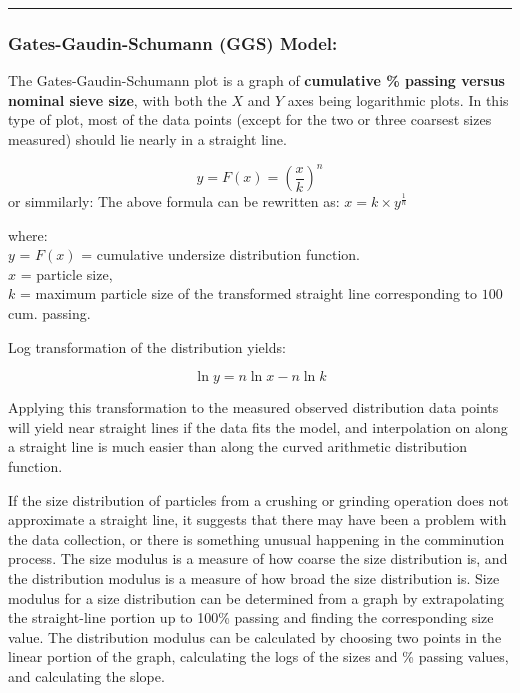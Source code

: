 \documentclass[
]{article}
\begin{document}
\begin{center}\rule{0.5\linewidth}{0.5pt}\end{center}

\hypertarget{gates-gaudin-schumann-ggs-model}{%
\subsubsection{Gates-Gaudin-Schumann (GGS)
Model:}\label{gates-gaudin-schumann-ggs-model}}

The Gates-Gaudin-Schumann plot is a graph of \textbf{cumulative \%
passing versus nominal sieve size}, with both the \(X\) and \(Y\) axes
being logarithmic plots. In this type of plot, most of the data points
(except for the two or three coarsest sizes measured) should lie nearly
in a straight line.

\[y = F(x) = \left(\frac{x}{k}\right) ^n\] or simmilarly: The above
formula can be rewritten as: \(x = k \times y ^ \frac{1}{n}\)

where:\\
\(y\) = \(F \left(x\right)\) = cumulative undersize distribution
function.\\
\(x\) = particle size,\\
\(k\) = maximum particle size of the transformed straight line
corresponding to \(100%
\) cum. passing.

Log transformation of the distribution yields:

\[\ln y = n \ln x - n \ln k\]

Applying this transformation to the measured observed distribution data
points will yield near straight lines if the data fits the model, and
interpolation on along a straight line is much easier than along the
curved arithmetic distribution function.

If the size distribution of particles from a crushing or grinding
operation does not approximate a straight line, it suggests that there
may have been a problem with the data collection, or there is something
unusual happening in the comminution process. The size modulus is a
measure of how coarse the size distribution is, and the distribution
modulus is a measure of how broad the size distribution is. Size modulus
for a size distribution can be determined from a graph by extrapolating
the straight-line portion up to 100\% passing and finding the
corresponding size value. The distribution modulus can be calculated by
choosing two points in the linear portion of the graph, calculating the
logs of the sizes and \% passing values, and calculating the slope.
\end{document}
